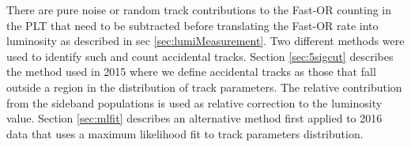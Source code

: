 


There are pure noise or random track contributions to the Fast-OR counting in the PLT that need to be subtracted before translating the Fast-OR rate into luminosity as described in sec \ref{sec:lumiMeasurement}. Two different methods were used to identify such and count accidental tracks. 
Section \ref{sec:5sigcut} describes the method used in 2015 where we define accidental tracks as those that fall outside a region in the distribution of track parameters. 
The relative contribution from the sideband populations is used as relative correction to the luminosity value. 
Section \ref{sec:mlfit} describes an alternative method first applied to 2016 data that uses a maximum likelihood fit to track parameters distribution. 





